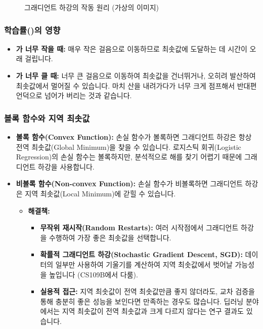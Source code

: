 \documentclass[11pt,a4paper]{article}
\theoremstyle{definition}
\begin{document}
\begin{figure}[h!]
    \centering
    \caption{그래디언트 하강의 작동 원리 (가상의 이미지)}
    \label{fig:gradient_descent}
\end{figure}

\subsubsection{학습률(\texttt{\eta})의 영향}
\begin{itemize}
    \item \textbf{\texttt{\eta}가 너무 작을 때:} 매우 작은 걸음으로 이동하므로 최솟값에 도달하는 데 시간이 오래 걸립니다.
    \item \textbf{\texttt{\eta}가 너무 클 때:} 너무 큰 걸음으로 이동하여 최솟값을 건너뛰거나, 오히려 발산하여 최솟값에서 멀어질 수 있습니다. 마치 산을 내려가다가 너무 크게 점프해서 반대편 언덕으로 넘어가 버리는 것과 같습니다.
\end{itemize}

\subsubsection{볼록 함수와 지역 최솟값}
\begin{itemize}
    \item \textbf{볼록 함수(Convex Function):} 손실 함수가 볼록하면 그래디언트 하강은 항상 전역 최솟값(Global Minimum)을 찾을 수 있습니다. 로지스틱 회귀(Logistic Regression)의 손실 함수는 볼록하지만, 분석적으로 해를 찾기 어렵기 때문에 그래디언트 하강을 사용합니다.
    \item \textbf{비볼록 함수(Non-convex Function):} 손실 함수가 비볼록하면 그래디언트 하강은 지역 최솟값(Local Minimum)에 갇힐 수 있습니다.
        \begin{itemize}
            \item \textbf{해결책:}
                \begin{itemize}
                    \item \textbf{무작위 재시작(Random Restarts):} 여러 시작점에서 그래디언트 하강을 수행하여 가장 좋은 최솟값을 선택합니다.
                    \item \textbf{확률적 그래디언트 하강(Stochastic Gradient Descent, SGD):} 데이터의 일부만 사용하여 기울기를 계산하여 지역 최솟값에서 벗어날 가능성을 높입니다 (CS109B에서 다룸).
                    \item \textbf{실용적 접근:} 지역 최솟값이 전역 최솟값만큼 좋지 않더라도, 교차 검증을 통해 충분히 좋은 성능을 보인다면 만족하는 경우도 많습니다. 딥러닝 분야에서는 지역 최솟값이 전역 최솟값과 크게 다르지 않다는 연구 결과도 있습니다.
                \end{itemize}
        \end{itemize}
\end{itemize}
\end{document}
